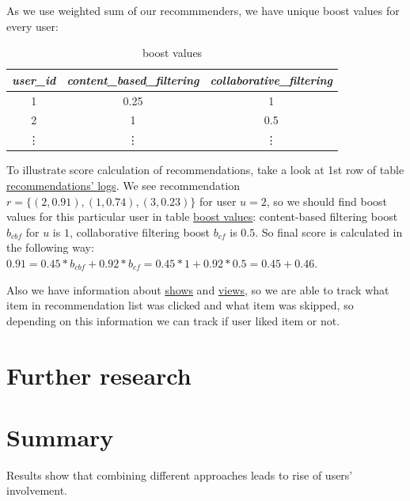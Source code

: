 \documentclass{article}
\begin{document}
    As we use weighted sum of our recommmenders, we have unique boost values for every user:

    \begin{table}[h]
        \centering
        \begin{tabular}{ccc}
            \toprule
            \textit{user\_id} & \textit{content\_based\_filtering} & \textit{collaborative\_filtering} \\
            \midrule
            1                 & 0.25                                  & 1                               \\
            2                 & 1                               & 0.5                                \\
            \vdots & \vdots & \vdots \\
            \bottomrule
            \end{tabular}%
        \caption{boost values}
        \label{tab:boost_values}
    \end{table}

    To illustrate score calculation of recommendations, take a look at 1st row of table \hyperref[tab:recommendation_logs]{recommendations' logs}. We see recommendation $r = \{(2, 0.91), (1, 0.74), (3, 0.23)\}$ for user $u = 2$, so we should find boost values for this particular user in table \hyperref[tab:boost_values]{boost values}: content-based filtering boost $b_{cbf}$ for $u$ is $1$, collaborative filtering boost $b_{cf}$ is $0.5$. So final score is calculated in the following way: $0.91 = 0.45 * b_{cbf} + 0.92 * b_{cf} = 0.45 * 1 + 0.92 * 0.5 = 0.45 + 0.46$.

    Also we have information about \hyperref[tab:show]{shows} and \hyperref[tab:view]{views}, so we are able to track what item in recommendation list was clicked and what item was skipped, so depending on this information we can track if user liked item or not.





\section{Further research}
\label{sec:further}

\section{Summary}
\label{sec:summary}

    Results show that combining different approaches leads to rise of users' involvement.

    


  
\end{document}
